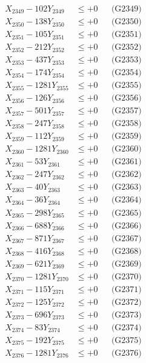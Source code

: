 \documentclass[a4paper,10pt]{article}
\begin{document}
{\begin{align}
X_{2349} - 102Y_{2349} &\leq +0 && \text{(G2349)} \\
X_{2350} - 138Y_{2350} &\leq +0 && \text{(G2350)} \\
\allowbreak
X_{2351} - 105Y_{2351} &\leq +0 && \text{(G2351)} \\
X_{2352} - 212Y_{2352} &\leq +0 && \text{(G2352)} \\
X_{2353} - 437Y_{2353} &\leq +0 && \text{(G2353)} \\
X_{2354} - 174Y_{2354} &\leq +0 && \text{(G2354)} \\
X_{2355} - 1281Y_{2355} &\leq +0 && \text{(G2355)} \\
X_{2356} - 126Y_{2356} &\leq +0 && \text{(G2356)} \\
X_{2357} - 501Y_{2357} &\leq +0 && \text{(G2357)} \\
X_{2358} - 247Y_{2358} &\leq +0 && \text{(G2358)} \\
X_{2359} - 112Y_{2359} &\leq +0 && \text{(G2359)} \\
X_{2360} - 1281Y_{2360} &\leq +0 && \text{(G2360)} \\
\allowbreak
X_{2361} - 53Y_{2361} &\leq +0 && \text{(G2361)} \\
X_{2362} - 247Y_{2362} &\leq +0 && \text{(G2362)} \\
X_{2363} - 40Y_{2363} &\leq +0 && \text{(G2363)} \\
X_{2364} - 36Y_{2364} &\leq +0 && \text{(G2364)} \\
X_{2365} - 298Y_{2365} &\leq +0 && \text{(G2365)} \\
X_{2366} - 688Y_{2366} &\leq +0 && \text{(G2366)} \\
X_{2367} - 871Y_{2367} &\leq +0 && \text{(G2367)} \\
X_{2368} - 416Y_{2368} &\leq +0 && \text{(G2368)} \\
X_{2369} - 621Y_{2369} &\leq +0 && \text{(G2369)} \\
X_{2370} - 1281Y_{2370} &\leq +0 && \text{(G2370)} \\
\allowbreak
X_{2371} - 115Y_{2371} &\leq +0 && \text{(G2371)} \\
X_{2372} - 125Y_{2372} &\leq +0 && \text{(G2372)} \\
X_{2373} - 696Y_{2373} &\leq +0 && \text{(G2373)} \\
X_{2374} - 83Y_{2374} &\leq +0 && \text{(G2374)} \\
X_{2375} - 192Y_{2375} &\leq +0 && \text{(G2375)} \\
X_{2376} - 1281Y_{2376} &\leq +0 && \text{(G2376)} \\

\end{align}}
\end{document}
